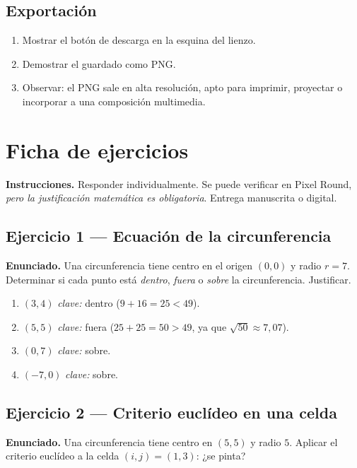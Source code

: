 \documentclass[12pt,a4paper]{scrartcl}
\begin{document}
\subsection{Exportación}
\begin{enumerate}[leftmargin=1.5em,itemsep=0.15em,topsep=0.3em]
  \item Mostrar el botón de descarga en la esquina del lienzo.
  \item Demostrar el guardado como PNG.
  \item Observar: el PNG sale en alta resolución, apto para imprimir, proyectar o incorporar a una composición multimedia.
\end{enumerate}

\newpage
\section{Ficha de ejercicios}\label{ap:ejer}

\textbf{Instrucciones.} Responder individualmente. Se puede verificar en Pixel Round, \emph{pero la justificación matemática es obligatoria}. Entrega manuscrita o digital.

\subsection*{Ejercicio 1 --- Ecuación de la circunferencia}
\textbf{Enunciado.} Una circunferencia tiene centro en el origen $(0, 0)$ y radio $r = 7$. Determinar si cada punto está \emph{dentro}, \emph{fuera} o \emph{sobre} la circunferencia. Justificar.
\begin{enumerate}[label=\alph*),leftmargin=1.5em,itemsep=0.1em,topsep=0.2em,nosep]
  \item $(3, 4)$ \hfill \emph{clave:} dentro ($9 + 16 = 25 < 49$).
  \item $(5, 5)$ \hfill \emph{clave:} fuera ($25 + 25 = 50 > 49$, ya que $\sqrt{50} \approx 7{,}07$).
  \item $(0, 7)$ \hfill \emph{clave:} sobre.
  \item $(-7, 0)$ \hfill \emph{clave:} sobre.
\end{enumerate}

\subsection*{Ejercicio 2 --- Criterio euclídeo en una celda}
\textbf{Enunciado.} Una circunferencia tiene centro en $(5, 5)$ y radio $5$. Aplicar el criterio euclídeo a la celda $(i, j) = (1, 3)$: ¿se pinta?
\end{document}

